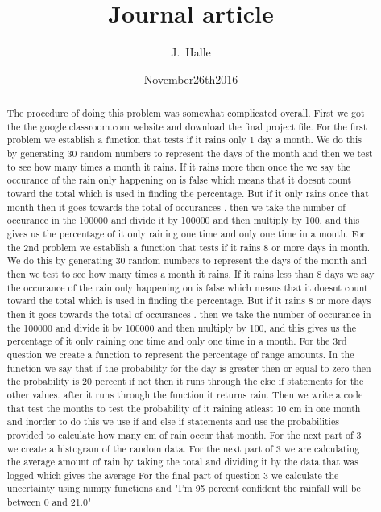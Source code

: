 \documentclass[twocolumn]{revtex4}
\begin{document}
\title{
Journal article
}
\author{J.~Halle}
\date{November26th2016}
\begin{abstract}
The procedure of doing this problem was somewhat complicated overall. First we got the the google.classroom.com website and download the final project file. For the first problem we establish a function that tests if it rains only 1 day a month. We do this by generating 30 random numbers to represent the days of the month and then we test to see how many times a month it rains. If it rains more then once the we say the occurance of the rain only happening on is false which means that it doesnt count toward the total which is used in finding the percentage. But if it only rains once that month then it goes towards the total of occurances  . then we take the number of occurance in the 100000 and divide it by 100000 and then multiply by 100, and this gives us the percentage of it only raining one time and only one time in a month.
For the 2nd problem we establish a function that tests if it rains 8 or more days in month. We do this by generating 30 random numbers to represent the days of the month and then we test to see how many times a month it rains. If it rains less than 8 days we say the occurance of the rain only happening on is false which means that it doesnt count toward the total which is used in finding the percentage. But if it rains 8 or more days then it goes towards the total of occurances  . then we take the number of occurance in the 100000 and divide it by 100000 and then multiply by 100, and this gives us the percentage of it only raining one time and only one time in a month.
For the 3rd question we create a function to represent the percentage of range amounts. In the function we say that if the probability for the day  is greater then or equal to zero then the probability is 20 percent if not then it runs through the else if statements for the other values. after it runs through the function it returns rain. Then we write a code that test the months to test the probability of it raining atleast 10 cm in one month and inorder to do this we use if and else if statements and use the probabilities provided to calculate how many cm of rain occur that month.
For the next part of 3 we create a histogram of the random data.
For the next part of 3 we are calculating the average amount of rain by taking the total and dividing it by the data that was logged which gives the average
For the final part of question 3 we calculate the uncertainty using numpy functions and "I'm 95 percent confident the rainfall will be between 0 and 21.0"
\end{abstract}
\maketitle
\end{document}
